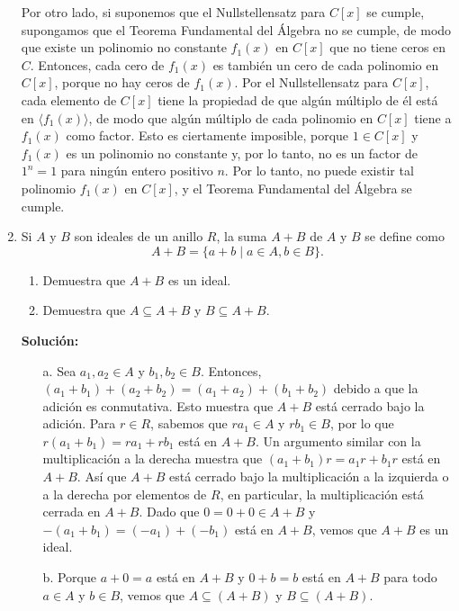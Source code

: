 \begin{enumerate}
    Por otro lado, si suponemos que el Nullstellensatz para $C[x]$ se cumple, supongamos que el Teorema Fundamental del Álgebra no se cumple, de modo que existe un polinomio no constante $f_1(x)$ en $C[x]$ que no tiene ceros en $C$. Entonces, cada cero de $f_1(x)$ es también un cero de cada polinomio en $C[x]$, porque no hay ceros de $f_1(x)$. Por el Nullstellensatz para $C[x]$, cada elemento de $C[x]$ tiene la propiedad de que algún múltiplo de él está en $\langle f_1(x) \rangle$, de modo que algún múltiplo de cada polinomio en $C[x]$ tiene a $f_1(x)$ como factor. Esto es ciertamente imposible, porque $1 \in C[x]$ y $f_1(x)$ es un polinomio no constante y, por lo tanto, no es un factor de $1^n = 1$ para ningún entero positivo $n$. Por lo tanto, no puede existir tal polinomio $f_1(x)$ en $C[x]$, y el Teorema Fundamental del Álgebra se cumple.
    \item Si $A$ y $B$ son ideales de un anillo $R$, la suma $A + B$ de $A$ y $B$ se define como
    \[
    A + B = \{a + b \mid a \in A, b \in B\}.
    \]
    \begin{enumerate}
        \item Demuestra que $A + B$ es un ideal.
        \item Demuestra que $A \subseteq A + B$ y $B \subseteq A + B$.
    \end{enumerate}
     \textbf{Solución:}
     \begin{enumerate}
    \item[a.] Sea $a_1 , a_2 \in A$ y $b_1 , b_2 \in B$. Entonces, $(a_1 + b_1) + (a_2 + b_2) = (a_1 + a_2) + (b_1 + b_2)$ debido a que la adición es conmutativa. Esto muestra que $A + B$ está cerrado bajo la adición. Para $r \in R$, sabemos que $ra_1 \in A$ y $rb_1 \in B$, por lo que $r(a_1 + b_1) = ra_1 + rb_1$ está en $A + B$. Un argumento similar con la multiplicación a la derecha muestra que $(a_1 + b_1)r = a_1 r + b_1 r$ está en $A + B$. Así que $A + B$ está cerrado bajo la multiplicación a la izquierda o a la derecha por elementos de $R$, en particular, la multiplicación está cerrada en $A + B$. Dado que $0 = 0 + 0 \in A + B$ y $-(a_1 + b_1) = (-a_1) + (-b_1)$ está en $A + B$, vemos que $A + B$ es un ideal.
    \item[b.] Porque $a + 0 = a$ está en $A + B$ y $0 + b = b$ está en $A + B$ para todo $a \in A$ y $b \in B$, vemos que $A \subseteq (A + B)$ y $B \subseteq (A + B)$.
    \end{enumerate}
    

\end{enumerate}
